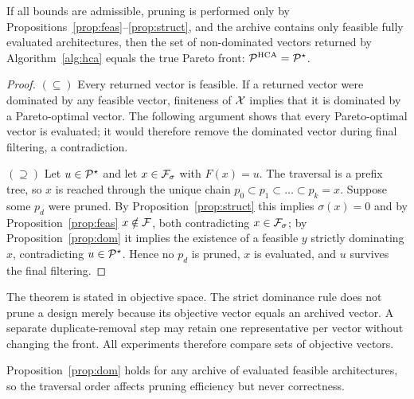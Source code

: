 \begin{theorem}
\label{thm:exact}
If all bounds are admissible, pruning is performed only by
Propositions~\ref{prop:feas}--\ref{prop:struct}, and the archive contains only feasible
fully evaluated architectures, then the set of non-dominated vectors returned by
Algorithm~\ref{alg:hca} equals the true Pareto front:
$\mathcal{P}^{\mathrm{HCA}}=\mathcal{P}^{\star}$.
\end{theorem}
\begin{proof}
$(\subseteq)$ Every returned vector is feasible. If a returned vector
were dominated by any feasible vector, finiteness of $\mathcal{X}$ implies that it is
dominated by a Pareto-optimal vector. The following argument shows that every
Pareto-optimal vector is evaluated; it would therefore remove the dominated
vector during final filtering, a contradiction.

$(\supseteq)$ Let $u\in\mathcal{P}^{\star}$ and let $x\in\mathcal{F}_\sigma$ with $F(x)=u$. The traversal is a
prefix tree, so $x$ is reached through the unique chain
$p_0\subset p_1\subset\dots\subset p_k=x$. Suppose some $p_d$ were pruned. By
Proposition~\ref{prop:struct} this implies $\sigma(x)=0$ and by
Proposition~\ref{prop:feas} $x\notin\mathcal{F}$, both contradicting $x\in\mathcal{F}_\sigma$; by
Proposition~\ref{prop:dom} it implies the existence of a feasible $y$ strictly dominating
$x$, contradicting $u\in\mathcal{P}^{\star}$. Hence no $p_d$ is pruned, $x$ is evaluated, and $u$ survives
the final filtering.
\end{proof}

\begin{remark}[Duplicates]
The theorem is stated in objective space. The strict dominance rule does not prune a design merely because its
objective vector equals an archived vector. A separate duplicate-removal step may
retain one representative per vector without changing the front. All experiments therefore compare sets of objective
vectors.
\end{remark}

\begin{remark}
Proposition~\ref{prop:dom} holds for any archive of evaluated feasible architectures, so
the traversal order affects pruning efficiency but never correctness.
\end{remark}

